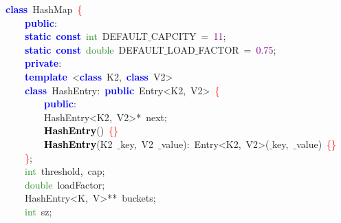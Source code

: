 \begin{center}\begin{minipage}{120mm}
\noindent
\mbox{}\textbf{\textcolor{Blue}{class}}\ \textcolor{TealBlue}{HashMap}\ \textcolor{Red}{\{} \\
\mbox{}\ \ \ \ \textbf{\textcolor{Blue}{public}}\textcolor{BrickRed}{:} \\
\mbox{}\ \ \ \ \textbf{\textcolor{Blue}{static}}\ \textbf{\textcolor{Blue}{const}}\ \textcolor{ForestGreen}{int}\ DEFAULT$\_$CAPCITY\ \textcolor{BrickRed}{=}\ \textcolor{Purple}{11}\textcolor{BrickRed}{;} \\
\mbox{}\ \ \ \ \textbf{\textcolor{Blue}{static}}\ \textbf{\textcolor{Blue}{const}}\ \textcolor{ForestGreen}{double}\ DEFAULT$\_$LOAD$\_$FACTOR\ \textcolor{BrickRed}{=}\ \textcolor{Purple}{0.75}\textcolor{BrickRed}{;} \\
\mbox{}\ \ \ \ \textbf{\textcolor{Blue}{private}}\textcolor{BrickRed}{:} \\
\mbox{}\ \ \ \ \textbf{\textcolor{Blue}{template}}\ \textcolor{BrickRed}{\textless{}}\textbf{\textcolor{Blue}{class}}\ \textcolor{TealBlue}{K2}\textcolor{BrickRed}{,}\ \textbf{\textcolor{Blue}{class}}\ \textcolor{TealBlue}{V2}\textcolor{BrickRed}{\textgreater{}} \\
\mbox{}\ \ \ \ \textbf{\textcolor{Blue}{class}}\ \textcolor{TealBlue}{HashEntry}\textcolor{BrickRed}{:}\ \textbf{\textcolor{Blue}{public}}\ Entry\textcolor{BrickRed}{\textless{}}K2\textcolor{BrickRed}{,}\ V2\textcolor{BrickRed}{\textgreater{}}\ \textcolor{Red}{\{} \\
\mbox{}\ \ \ \ \ \ \ \ \textbf{\textcolor{Blue}{public}}\textcolor{BrickRed}{:} \\
\mbox{}\ \ \ \ \ \ \ \ HashEntry\textcolor{BrickRed}{\textless{}}K2\textcolor{BrickRed}{,}\ V2\textcolor{BrickRed}{\textgreater{}*}\ next\textcolor{BrickRed}{;} \\
\mbox{}\ \ \ \ \ \ \ \ \textbf{\textcolor{Black}{HashEntry}}\textcolor{BrickRed}{()}\ \textcolor{Red}{\{\}} \\
\mbox{}\ \ \ \ \ \ \ \ \textbf{\textcolor{Black}{HashEntry}}\textcolor{BrickRed}{(}\textcolor{TealBlue}{K2}\ $\_$key\textcolor{BrickRed}{,}\ \textcolor{TealBlue}{V2}\ $\_$value\textcolor{BrickRed}{):}\ Entry\textcolor{BrickRed}{\textless{}}K2\textcolor{BrickRed}{,}\ V2\textcolor{BrickRed}{\textgreater{}(}$\_$key\textcolor{BrickRed}{,}\ $\_$value\textcolor{BrickRed}{)}\ \textcolor{Red}{\{\}} \\
\mbox{}\ \ \ \ \textcolor{Red}{\}}\textcolor{BrickRed}{;} \\
\mbox{}\ \ \ \ \textcolor{ForestGreen}{int}\ threshold\textcolor{BrickRed}{,}\ cap\textcolor{BrickRed}{;} \\
\mbox{}\ \ \ \ \textcolor{ForestGreen}{double}\ loadFactor\textcolor{BrickRed}{;} \\
\mbox{}\ \ \ \ HashEntry\textcolor{BrickRed}{\textless{}}K\textcolor{BrickRed}{,}\ V\textcolor{BrickRed}{\textgreater{}**}\ buckets\textcolor{BrickRed}{;} \\
\mbox{}\ \ \ \ \textcolor{ForestGreen}{int}\ sz\textcolor{BrickRed}{;}
\end{minipage}\end{center}

